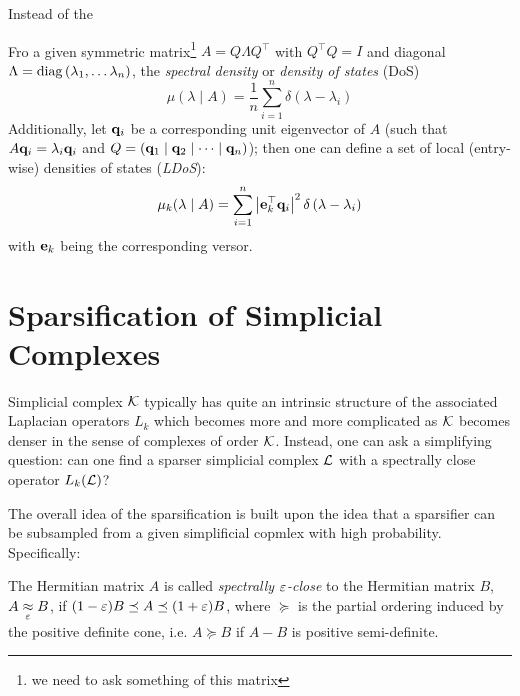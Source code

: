 \documentclass{mynotes}
\begin{document}
Instead of the 

\begin{definition}
      Fro a given symmetric matrix\footnote{we need to ask something of this matrix} \( A = Q \Lambda Q^\top \) with \( Q^\top Q = I \) and diagonal \( \Lambda = \operatorname{diag} \left( \lambda_1, \dots \lambda_{n} \right) \), the \emph{spectral density} or \emph{density of states} (DoS)
      \begin{equation}
            \mu( \lambda \mid A ) = \frac{1}{n} \sum_{i=1}^{n} \delta \left( \lambda - \lambda_i \right)
      \end{equation}
      Additionally, let \( \mathbf{q}_i \) be a corresponding unit eigenvector of \( A \) (such that \( A \mathbf{q}_i = \lambda_i \mathbf{q}_i \) and \( Q = \left( \mathbf{q}_1 \mid \mathbf{q}_2 \mid \dots \mid \mathbf{q}_n \right)\)); then one can define a set of local (entry-wise) densities of states (\emph{LDoS}):
      \begin{equation}
            \mu_k ( \lambda \mid A ) = \sum_{i=1}^{n} \left| \mathbf{e}_k^\top \mathbf{q}_i \right|^2 \delta \left( \lambda - \lambda_i \right)
      \end{equation}
      with \( \mathbf{e}_k \) being the corresponding versor. 
\end{definition}

\chapter{ Sparsification of Simplicial Complexes }

Simplicial complex \( \mathcal{K} \) typically has quite an intrinsic structure of the associated Laplacian operators \( L_k \) which becomes more and more complicated as \( \mathcal{K} \) becomes denser in the sense of complexes of order \( \mathcal{K} \). Instead, one can ask a simplifying question: can one find a sparser simplicial complex \( \mathcal{L} \) with a spectrally close operator \( L_k (\mathcal{L} )\)?

The overall idea of the sparsification is built upon the idea that a sparsifier can be subsampled from a given simplificial copmlex with high probability. Specifically: 
\begin{definition}
      The Hermitian matrix \( A \) is called \emph{spectrally \(\varepsilon\)-close} to the Hermitian matrix \( B \), \( A \underset{\varepsilon}{\approx} B \), if 
            $( 1 - \varepsilon ) B \preceq A \preceq ( 1 + \varepsilon ) B $,
      where \( \succeq \) is the partial ordering induced by the positive definite cone, i.e. \( A \succeq B \) if \( A - B \) is positive semi-definite.
\end{definition}
\end{document}
